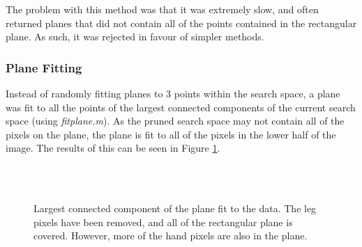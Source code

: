 \documentclass[11pt]{article}
\begin{document}
The problem with this method was that it was extremely slow, and often returned planes that did not contain all of the points contained in the rectangular plane. As such, it was rejected in favour of simpler methods.

\subsubsection{Plane Fitting}
Instead of randomly fitting planes to 3 points within the search space, a plane was fit to all the points of the largest connected components of the current search space (using \emph{fitplane.m}). As the pruned search space may not contain all of the pixels on the plane, the plane is fit to all of the pixels in the lower half of the image. The results of this can be seen in Figure \ref{fig:plane}.

\begin{figure}
  \centering
   ~
   \\
   ~
  \caption{Largest connected component of the plane fit to the data. The leg pixels have been removed, and all of the rectangular plane is covered. However, more of the hand pixels are also in the plane.}
  \label{fig:plane}
\end{figure}
\end{document}
